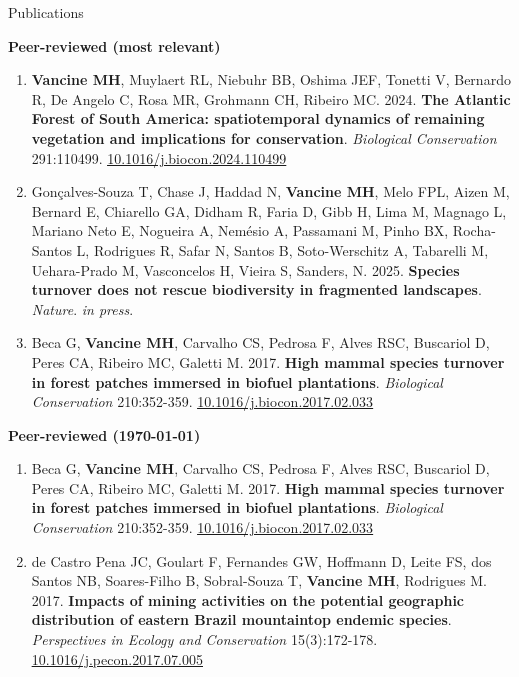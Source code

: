 \documentclass{resume}
\begin{document}

\begin{rSection}{Publications}

{\bf Peer-reviewed (most relevant)}

\begin{enumerate} 

\item {\bf Vancine MH}, Muylaert RL, Niebuhr BB, Oshima JEF, Tonetti V, Bernardo R, De Angelo C, Rosa MR, Grohmann CH, Ribeiro MC. 2024. {\bf The Atlantic Forest of South America: spatiotemporal dynamics of remaining vegetation and implications for conservation}. {\it Biological Conservation} 291:110499. \href{https://doi.org/10.1016/j.biocon.2024.110499}{\underline{10.1016/j.biocon.2024.110499}}

\item Gonçalves-Souza T, Chase J, Haddad N, {\bf Vancine MH}, Melo FPL, Aizen M, Bernard E, Chiarello GA, Didham R, Faria D, Gibb H, Lima M, Magnago L, Mariano Neto E, Nogueira A, Nemésio A, Passamani M, Pinho BX, Rocha-Santos L, Rodrigues R, Safar N, Santos B, Soto-Werschitz A, Tabarelli M, Uehara-Prado M, Vasconcelos H, Vieira S, Sanders, N. 2025. {\bf Species turnover does not rescue biodiversity in fragmented landscapes}. {\it Nature}. {\it in press}.

\item Beca G, {\bf Vancine MH}, Carvalho CS, Pedrosa F, Alves RSC, Buscariol D, Peres CA, Ribeiro MC, Galetti M. 2017. {\bf High mammal species turnover in forest patches immersed in biofuel plantations}. {\it Biological Conservation} 210:352-359. \href{https://doi.org/10.1016/j.biocon.2017.02.033}{\underline{10.1016/j.biocon.2017.02.033}}

\end{enumerate} 

{\bf Peer-reviewed (\today)}

\begin{enumerate} 
\item Beca G, {\bf Vancine MH}, Carvalho CS, Pedrosa F, Alves RSC, Buscariol D, Peres CA, Ribeiro MC, Galetti M. 2017. {\bf High mammal species turnover in forest patches immersed in biofuel plantations}. {\it Biological Conservation} 210:352-359. \href{https://doi.org/10.1016/j.biocon.2017.02.033}{\underline{10.1016/j.biocon.2017.02.033}}

\item de Castro Pena JC, Goulart F, Fernandes GW, Hoffmann D, Leite FS, dos Santos NB, Soares-Filho B, Sobral-Souza T, {\bf Vancine MH}, Rodrigues M. 2017. {\bf Impacts of mining activities on the potential geographic distribution of eastern Brazil mountaintop endemic species}. {\it Perspectives in Ecology and Conservation} 15(3):172-178. \href{https://doi.org/10.1016/j.pecon.2017.07.005}{\underline{10.1016/j.pecon.2017.07.005}}


\end{enumerate}
\end{rSection}
\end{document}

